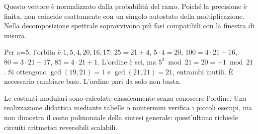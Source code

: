 
Questo vettore è normalizzato dalla probabilità del ramo. Poiché la precisione è finita, non coincide esattamente con un singolo autostato della moltiplicazione. Nella decomposizione spettrale sopravvivono più fasi compatibili con la finestra di misura.


Per a=5, l’orbita è \(1,5,4,20,16,17\): \(25=21+4\), \(5\cdot4=20\), \(100=4\cdot21+16\), \(80=3\cdot21+17\), \(85=4\cdot21+1\). L’ordine è sei, ma \(5^3\bmod21=20=-1\bmod21\). Si ottengono \(\gcd(19,21)=1\) e \(\gcd(21,21)=21\), entrambi inutili. È necessario cambiare base. L’ordine pari da solo non basta.


Le costanti modulari sono calcolate classicamente senza conoscere l’ordine. Una realizzazione didattica mediante tabelle o mintermini verifica i piccoli esempi, ma non dimostra il costo polinomiale della sintesi generale: quest’ultimo richiede circuiti aritmetici reversibili scalabili.


